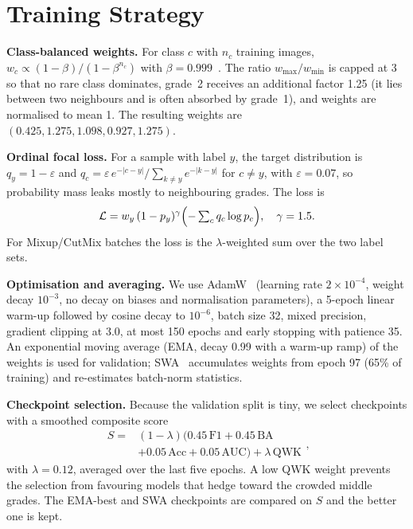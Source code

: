 \documentclass[10pt,twocolumn]{article}
\begin{document}
\section{Training Strategy}\label{sec:train}
\textbf{Class-balanced weights.} For class $c$ with $n_c$ training images, $w_c\propto(1-\beta)/(1-\beta^{n_c})$ with $\beta{=}0.999$~\cite{cbloss}. The ratio $w_{\max}/w_{\min}$ is capped at 3 so that no rare class dominates, grade~2 receives an additional factor 1.25 (it lies between two neighbours and is often absorbed by grade~1), and weights are normalised to mean 1. The resulting weights are $(0.425, 1.275, 1.098, 0.927, 1.275)$.

\textbf{Ordinal focal loss.} For a sample with label $y$, the target distribution is $q_y=1-\varepsilon$ and $q_c=\varepsilon\,e^{-|c-y|}/\sum_{k\ne y}e^{-|k-y|}$ for $c\ne y$, with $\varepsilon{=}0.07$, so probability mass leaks mostly to neighbouring grades. The loss is
\begin{equation}
\mathcal{L}=w_y\,(1-p_y)^{\gamma}\Bigl(-\textstyle\sum_{c}q_c\log p_c\Bigr),\quad \gamma=1.5 .
\label{eq:loss}
\end{equation}
For Mixup/CutMix batches the loss is the $\lambda$-weighted sum over the two label sets.

\textbf{Optimisation and averaging.} We use AdamW~\cite{adamw} (learning rate $2{\times}10^{-4}$, weight decay $10^{-3}$, no decay on biases and normalisation parameters), a 5-epoch linear warm-up followed by cosine decay to $10^{-6}$, batch size 32, mixed precision, gradient clipping at 3.0, at most 150 epochs and early stopping with patience 35. An exponential moving average (EMA, decay 0.99 with a warm-up ramp) of the weights is used for validation; SWA~\cite{swa} accumulates weights from epoch 97 (65\% of training) and re-estimates batch-norm statistics.

\textbf{Checkpoint selection.} Because the validation split is tiny, we select checkpoints with a smoothed composite score
\begin{equation}
\begin{split}S={}&(1-\lambda)\bigl(0.45\,\mathrm{F1}+0.45\,\mathrm{BA}\\&+0.05\,\mathrm{Acc}+0.05\,\mathrm{AUC}\bigr)+\lambda\,\mathrm{QWK}\end{split},
\end{equation}
with $\lambda{=}0.12$, averaged over the last five epochs. A low QWK weight prevents the selection from favouring models that hedge toward the crowded middle grades. The EMA-best and SWA checkpoints are compared on $S$ and the better one is kept.
\end{document}
